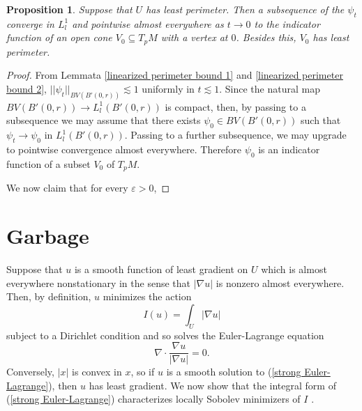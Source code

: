 \documentclass[reqno,12pt,letterpaper]{amsart}
\newtheorem{proposition}[theorem]{Proposition}
\theoremstyle{definition}
\numberwithin{equation}{section}
\begin{document}
\begin{proposition}
Suppose that $U$ has least perimeter.
Then a subsequence of the $\psi_t$ converge in $L^1_l$ and pointwise almost everywhere as $t \to 0$ to the indicator function of an open cone $V_0 \subseteq T_pM$ with a vertex at $0$.
Besides this, $V_0$ has least perimeter.
\end{proposition}
\begin{proof}
From Lemmata \ref{linearized perimeter bound 1} and \ref{linearized perimeter bound 2}, $||\psi_t||_{BV(B'(0, r))} \lesssim 1$ uniformly in $t \lesssim 1$.
Since the natural map $BV(B'(0, r)) \to L^1_l(B'(0, r))$ is compact, then, by passing to a subsequence we may assume that there exists $\psi_0 \in BV(B'(0, r))$ such that $\psi_t \to \psi_0$ in $L^1_l(B'(0, r))$.
Passing to a further subsequence, we may upgrade to pointwise convergence almost everywhere.
Therefore $\psi_0$ is an indicator function of a subset $V_0$ of $T_pM$.

We now claim that for every $\varepsilon > 0$,
\end{proof}





\section{Garbage}

Suppose that $u$ is a smooth function of least gradient on $U$ which is almost everywhere nonstationary in the sense that $|\nabla u|$ is nonzero almost everywhere.
Then, by definition, $u$ minimizes the action
$$I(u) = \int_U |\nabla u|$$
subject to a Dirichlet condition and so solves the Euler-Lagrange equation
\begin{equation}
\label{strong Euler-Lagrange}
\nabla \cdot \frac{\nabla u}{|\nabla u|} = 0.
\end{equation}
Conversely, $|x|$ is convex in $x$, so if $u$ is a smooth solution to (\ref{strong Euler-Lagrange}), then $u$ has least gradient.
We now show that the integral form of (\ref{strong Euler-Lagrange}) characterizes locally Sobolev minimizers of $I$ \cite[Lemma 1]{BOMBIERI1969}.
\end{document}
